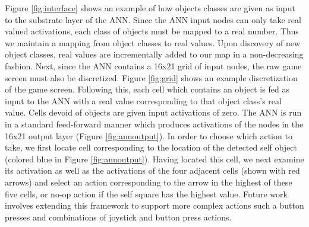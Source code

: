 \documentclass{acm_proc_article-sp}
\begin{document}
Figure \ref{fig:interface} shows an example of how objects classes are given as input to the substrate layer of the ANN. Since the ANN input nodes can only take real valued activations, each class of objects must be mapped to a real number. Thus we maintain a mapping from object classes to real values. Upon discovery of new object classes, real values are incrementally added to our map in a non-decreasing fashion. Next, since the ANN contains a 16x21 grid of input nodes, the raw game screen must also be discretized. Figure \ref{fig:grid} shows an example discretization of the game screen. Following this, each cell which contains an object is fed as input to the ANN with a real value corresponding to that object class's real value. Cells devoid of objects are given input activations of zero. The ANN is run in a standard feed-forward manner which produces activations of the nodes in the 16x21 output layer (Figure \ref{fig:annoutput}). In order to choose which action to take, we first locate cell corresponding to the location of the detected self object (colored blue in Figure \ref{fig:annoutput}). Having located this cell, we next examine its activation as well as the activations of the four adjacent cells (shown with red arrows) and select an action corresponding to the arrow in the highest of these five cells, or no-op action if the self square has the highest value. Future work involves extending this framework to support more complex actions such a button presses and combinations of joystick and button press actions.
\end{document}
